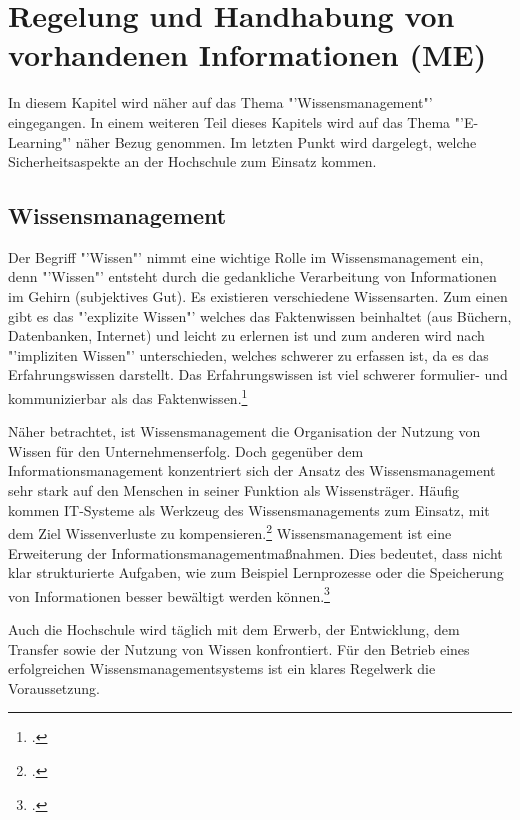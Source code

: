 \section{Regelung und Handhabung von vorhandenen Informationen (ME)}

In diesem Kapitel wird näher auf das Thema "'Wissensmanagement"' eingegangen. In einem weiteren Teil dieses Kapitels wird auf das Thema "'E-Learning"' näher Bezug genommen. Im letzten Punkt wird dargelegt, welche Sicherheitsaspekte an der Hochschule zum Einsatz kommen.

\subsection{Wissensmanagement}

Der Begriff "'Wissen"' nimmt eine wichtige Rolle im Wissensmanagement ein, denn "'Wissen"' entsteht durch die 
gedankliche Verarbeitung von Informationen im Gehirn (subjektives Gut). Es existieren verschiedene Wissensarten. 
Zum einen gibt es das "'explizite Wissen"' welches das Faktenwissen beinhaltet (aus Büchern, Datenbanken, Internet) 
und leicht zu erlernen ist und zum anderen wird nach "'impliziten Wissen"' unterschieden, welches schwerer zu 
erfassen ist, da es das Erfahrungswissen darstellt. Das Erfahrungswissen ist viel schwerer formulier- und 
kommunizierbar als das Faktenwissen.\footcite[Vgl.][]{wissensmangement_infowiss.net_2009}

Näher betrachtet, ist Wissensmanagement die Organisation der Nutzung von Wissen für den Unternehmenserfolg. 
Doch gegenüber dem Informationsmanagement konzentriert sich der Ansatz des Wissensmanagement sehr stark auf 
den Menschen in seiner Funktion als Wissensträger. Häufig kommen IT-Systeme als Werkzeug des 
Wissensmanagements zum Einsatz, mit dem Ziel Wissenverluste zu kompensieren.\footcite[Vgl.][]{wissensmangement_infowiss.net_2009} Wissensmanagement ist eine 
Erweiterung der Informationsmanagementmaßnahmen. Dies bedeutet, dass nicht klar strukturierte Aufgaben, wie zum 
Beispiel Lernprozesse oder die Speicherung von Informationen besser bewältigt werden können.\footcite[Vgl.][]{wissensmangement_vfhinf.oncampus.de_2013}

Auch die Hochschule wird täglich mit dem Erwerb, der Entwicklung, dem Transfer sowie der Nutzung von 
Wissen konfrontiert. Für den Betrieb eines erfolgreichen Wissensmanagementsystems ist ein klares Regelwerk die Voraussetzung. 

